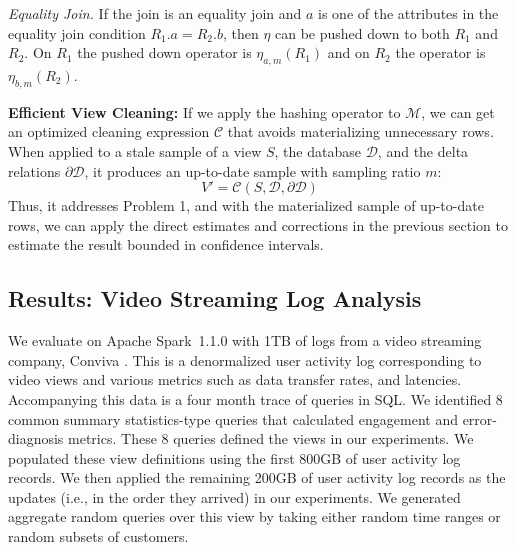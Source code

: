 \emph{Equality Join. } If the join is an equality join and $a$ is one of the attributes in the equality join condition $R_1.a = R_2.b$, then $\eta$ can be pushed down to both $R_1$ and $R_2$. On $R_1$ the pushed down operator is $\eta_{a, m}(R_1)$ and on $R_2$ the operator is $\eta_{b, m}(R_2)$.

\vspace{0.5em} 

\noindent \textbf{Efficient View Cleaning: }
If we apply the hashing operator to $\mathcal{M}$, we can get an optimized cleaning expression $\mathcal{C}$ that avoids materializing unnecessary rows. 
When applied to a stale sample of a view $S$, the database $\mathcal{D}$, and the delta relations $\partial \mathcal{D}$, it produces an up-to-date sample with sampling ratio $m$:
\[
V' = \mathcal{C}(S,\mathcal{D},\partial \mathcal{D})
\]
Thus, it addresses Problem 1, and with the materialized sample of up-to-date rows, we can apply the direct estimates and corrections in the previous section to estimate the result bounded in confidence intervals.

\subsection{Results: Video Streaming Log Analysis}
We evaluate \svc on Apache Spark~1.1.0 with 1TB of logs from a video streaming company, Conviva \cite{conviva}.
This is a denormalized user activity log corresponding to video views and various metrics such as data transfer rates, and latencies.
Accompanying this data is a four month trace of queries in SQL.
We identified 8 common summary statistics-type queries that calculated engagement and error-diagnosis metrics.
These 8 queries defined the views in our experiments.
We populated these view definitions using the first 800GB of user activity log records.  
We then applied the remaining 200GB of user activity log records as the updates (i.e., in the order they arrived) in our experiments.
We generated aggregate random queries over this view by taking either random time ranges or random subsets of customers.

